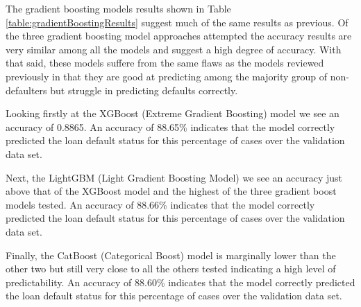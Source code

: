 \documentclass[12pt]{article}
\begin{document}
The gradient boosting models results shown in Table \ref{table:gradientBoostingResults} suggest much of the same results as previous. Of the three gradient boosting model approaches attempted the accuracy results are very similar among all the models and suggest a high degree of accuracy. With that said, these models suffere from the same flaws as the models reviewed previously in that they are good at predicting among the majority group of non-defaulters but struggle in predicting defaults correctly.

Looking firstly at the XGBoost (Extreme Gradient Boosting) model we see an accuracy of 0.8865. An accuracy of 88.65\% indicates that the model correctly predicted the loan default status for this percentage of cases over the validation data set.

Next, the LightGBM (Light Gradient Boosting Model) we see an accuracy just above that of the XGBoost model and the highest of the three gradient boost models tested. An accuracy of 88.66\% indicates that the model correctly predicted the loan default status for this percentage of cases over the validation data set.

Finally, the CatBoost (Categorical Boost) model is marginally lower than the other two but still very close to all the others tested indicating a high level of predictability. An accuracy of 88.60\% indicates that the model correctly predicted the loan default status for this percentage of cases over the validation data set.
\end{document}

